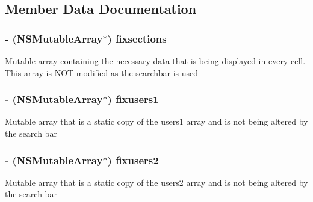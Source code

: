 \subsection{Member Data Documentation}
\hypertarget{category_e_s_people_view_07_08_afcff1f649c563bc03d33485da6a0b301}{}
\subsubsection[{fixsections}]{\setlength{\rightskip}{0pt plus 5cm}-\/ (N\+S\+Mutable\+Array$\ast$) fixsections\hspace{0.3cm}{\ttfamily [protected]}}\label{category_e_s_people_view_07_08_afcff1f649c563bc03d33485da6a0b301}
Mutable array containing the necessary data that is being displayed in every cell. This array is N\+O\+T modified as the searchbar is used \hypertarget{category_e_s_people_view_07_08_a954a179cb18d86817fd3b4369343d72f}{}
\subsubsection[{fixusers1}]{\setlength{\rightskip}{0pt plus 5cm}-\/ (N\+S\+Mutable\+Array$\ast$) fixusers1\hspace{0.3cm}{\ttfamily [protected]}}\label{category_e_s_people_view_07_08_a954a179cb18d86817fd3b4369343d72f}
Mutable array that is a static copy of the users1 array and is not being altered by the search bar \hypertarget{category_e_s_people_view_07_08_a99e5b8f0def7ef8a541c15af7bb147fc}{}
\subsubsection[{fixusers2}]{\setlength{\rightskip}{0pt plus 5cm}-\/ (N\+S\+Mutable\+Array$\ast$) fixusers2\hspace{0.3cm}{\ttfamily [protected]}}\label{category_e_s_people_view_07_08_a99e5b8f0def7ef8a541c15af7bb147fc}
Mutable array that is a static copy of the users2 array and is not being altered by the search bar \hypertarget{category_e_s_people_view_07_08_ac4b9d7c2158586b80c913ed69fd1611f}{}
